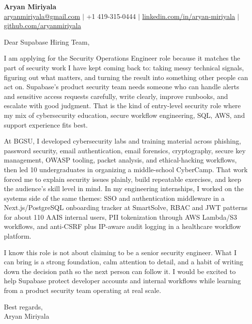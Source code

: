\documentclass[11pt]{letter}
\begin{document}
\begin{center}
{\Large \textbf{Aryan Miriyala}}\\
\href{mailto:aryanmiriyala@gmail.com}{aryanmiriyala@gmail.com} $|$ +1 419-315-0444 $|$
\href{https://www.linkedin.com/in/aryan-miriyala-7788a21b6/}{linkedin.com/in/aryan-miriyala} $|$
\href{https://github.com/aryanmiriyala}{github.com/aryanmiriyala}
\end{center}

\vspace{0.18in}

Dear Supabase Hiring Team,

I am applying for the Security Operations Engineer role because it matches the part of security work I have kept coming back to: taking messy technical signals, figuring out what matters, and turning the result into something other people can act on. Supabase's product security team needs someone who can handle alerts and sensitive access requests carefully, write clearly, improve runbooks, and escalate with good judgment. That is the kind of entry-level security role where my mix of cybersecurity education, secure workflow engineering, SQL, AWS, and support experience fits best.

At BGSU, I developed cybersecurity labs and training material across phishing, password security, email authentication, email forensics, cryptography, secure key management, OWASP tooling, packet analysis, and ethical-hacking workflows, then led 10 undergraduates in organizing a middle-school CyberCamp. That work forced me to explain security issues plainly, build repeatable exercises, and keep the audience's skill level in mind. In my engineering internships, I worked on the systems side of the same themes: SSO and authentication middleware in a Next.js/PostgreSQL onboarding tracker at SmartSolve, RBAC and JWT patterns for about 110 AAIS internal users, PII tokenization through AWS Lambda/S3 workflows, and anti-CSRF plus IP-aware audit logging in a healthcare workflow platform.

I know this role is not about claiming to be a senior security engineer. What I can bring is a strong foundation, calm attention to detail, and a habit of writing down the decision path so the next person can follow it. I would be excited to help Supabase protect developer accounts and internal workflows while learning from a product security team operating at real scale.

\vspace{0.10in}

Best regards,\\
Aryan Miriyala
\end{document}
